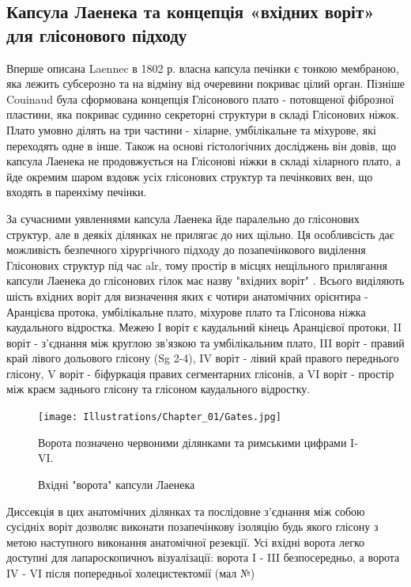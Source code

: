 \subsection{Капсула Лаенека та концепція «вхідних воріт» для глісонового підходу}

Вперше описана Laennec в 1802 р. власна капсула печінки є тонкою мембраною, яка лежить субсерозно та на відміну від очеревини покриває цілий орган. Пізніше Couinaud була сформована концепція Глісонового плато - потовщеної фіброзної пластини, яка покриває судинно секреторні структури в складі Глісонових ніжок. Плато умовно ділять на три частини - хіларне, умбілікальне та міхурове, які переходять одне в інше. Також на основі гістологічних досліджень він довів, що капсула Лаенека не продовжується на Глісонові ніжки в складі хіларного плато, а йде окремим шаром вздовж усіх глісонових структур та печінкових вен, що входять в паренхіму печінки.

За сучасними уявленнями капсула Лаенека йде паралельно до глісонових структур, але в деякіх ділянках не прилягає до них щільно. Ця особливсість дає можливість безпечного хірургічного підходу до позапечінкового виділення Глісонових структур під час \acrshort{alr}, тому простір в місцях нещільного прилягання капсули Лаенека до глісонових гілок має назву "вхідних воріт" \cite{Sugioka2017}. Всього виділяють шість вхідних воріт для визначення яких є чотири анатомічних орієнтира - Аранцієва протока, умбілікальне плато, міхурове плато та Глісонова ніжка каудального відростка. Межею I воріт є каудальний кінець Аранцієвої протоки, II воріт - з'єднання між круглою зв'язкою та умбілікальним плато, III воріт - правий край лівого дольового глісону (Sg 2-4), IV воріт - лівий край правого переднього глісону, V воріт - біфуркація правих сегментарних глісонів, а VI воріт - простір між краєм заднього глісону та глісоном каудального відростку. 

\begin{figure}[h]
\caption{Вхідні "ворота" капсули Лаенека}

\texttt{[image: Illustrations/Chapter\_01/Gates.jpg]}
\label{fig:Gates}

\small
Ворота позначено червоними ділянками та римськими цифрами I-VI.
\end{figure}


Диссекція в цих анатомічних ділянках та послідовне з'єднання між собою сусідніх воріт дозволяє виконати позапечінкову ізоляцію будь якого глісону з метою наступного виконання анатомічної резекції. Усі вхідні ворота легко доступні для лапароскопичноъ візуалізації: ворота I - III безпосередньо, а ворота IV - VI після попередньої холецистектомії (мал №)

